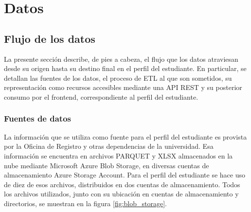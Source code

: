 \chapter{Datos}

\section{Flujo de los datos}

La presente sección describe, de pies a cabeza, el flujo que los datos atraviesan desde su origen hasta su destino final en el perfil del estudiante. En particular, se detallan las fuentes de los datos, el proceso de \gls{ETL} al que son sometidos, su representación como recursos accesibles mediante una \gls{API REST} y su posterior consumo por el frontend, correspondiente al perfil del estudiante.

\subsection{Fuentes de datos}

La información que se utiliza como fuente para el perfil del estudiante es provista por la Oficina de Registro y otras dependencias de la universidad. %
Esa información se encuentra en archivos PARQUET y XLSX almacenados en la nube mediante Microsoft Azure Blob Storage, en diversas cuentas de almacenamiento Azure Storage Account. Para el perfil del estudiante se hace uso de diez de esos archivos, distribuidos en dos cuentas de almacenamiento. Todos los archivos utilizados, junto con su ubicación en cuentas de almacenamiento y directorios, se muestran en la figura \ref{fig:blob_storage}.

